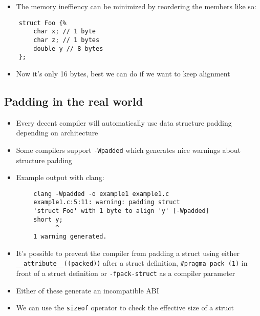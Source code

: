 \documentclass{beamer}
\begin{document}
\begin{frame}[fragile]{\insertsection}{\insertsubsection}
    \begin{itemize}
        \item The memory ineffiency can be minimized by reordering the members like so:
    \end{itemize}
    \begin{verbatim}
    struct Foo {%
        char x; // 1 byte
        char z; // 1 bytes
        double y // 8 bytes
    };
    \end{verbatim}
    \begin{itemize}
        \item Now it's only 16 bytes, best we can do if we want to keep alignment
    \end{itemize}
\end{frame}

\subsection{Padding in the real world}
\begin{frame}[fragile]{\insertsection}{\insertsubsection}
    \begin{itemize}
        \item Every decent compiler will automatically use data structure padding depending
            on architecture
        \item Some compilers support \verb|-Wpadded| which generates nice warnings about structure
            padding
        \item Example output with clang:
    \end{itemize}
    \begin{verbatim}
        clang -Wpadded -o example1 example1.c
        example1.c:5:11: warning: padding struct 
        'struct Foo' with 1 byte to align 'y' [-Wpadded]
        short y;
              ^
        1 warning generated.
    \end{verbatim}
\end{frame}

\begin{frame}[fragile]{\insertsection}{\insertsubsection}
    \begin{itemize}
        \item It's possible to prevent the compiler from padding a struct using either
            \verb|__attribute__((packed))| after a struct definition, \verb|#pragma pack (1)| in
            front of a struct definition or \verb|-fpack-struct| as a compiler parameter
        \item Either of these generate an incompatible ABI
        \item We can use the \verb|sizeof| operator to check the effective size of a struct
    \end{itemize}
\end{frame}
\end{document}
